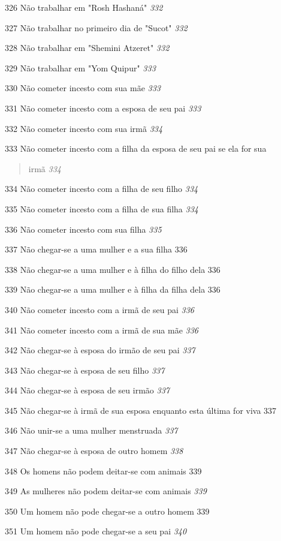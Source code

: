 326 Não trabalhar em "Rosh Hashaná" \emph{332}

327 Não trabalhar no primeiro dia de "Sucot" \emph{332}

328 Não trabalhar em "Shemini Atzeret" \emph{332}

329 Não trabalhar em "Yom Quipur" \emph{333}

330 Não cometer incesto com sua mãe \emph{333}

331 Não cometer incesto com a esposa de seu pai \emph{333}

332 Não cometer incesto com sua irmã \emph{334}

333 Não cometer incesto com a filha da esposa de seu pai se ela for sua

\begin{quote}
irmã \emph{334}
\end{quote}

334 Não cometer incesto com a filha de seu filho \emph{334}

335 Não cometer incesto com a filha de sua filha \emph{334}

336 Não cometer incesto com sua filha \emph{335}

337 Não chegar-se a uma mulher e a sua filha 336

338 Não chegar-se a uma mulher e à filha do filho dela 336

339 Não chegar-se a uma mulher e à filha da filha dela 336

340 Não cometer incesto com a irmã de seu pai \emph{336}

341 Não cometer incesto com a irmã de sua mãe \emph{336}

342 Não chegar-se à esposa do irmão de seu pai \emph{337}

343 Não chegar-se à esposa de seu filho \emph{337}

344 Não chegar-se à esposa de seu irmão \emph{337}

345 Não chegar-se à irmã de sua esposa enquanto esta última for viva 337

346 Não unir-se a uma mulher menstruada \emph{337}

347 Não chegar-se à esposa de outro homem \emph{338}

348 Os homens não podem deitar-se com animais 339

349 As mulheres não podem deitar-se com animais \emph{339}

350 Um homem não pode chegar-se a outro homem 339

351 Um homem não pode chegar-se a seu pai \emph{340}

